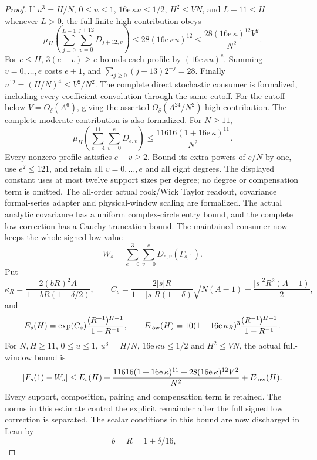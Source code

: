 \begin{proof}
If \(u^3=H/N\), \(0\leq u\leq1\),
\(16\mathrm e\,\kappa u\leq1/2\), \(H^2\leq VN\), and
\(L+11\leq H\) whenever \(L>0\), the full finite high contribution obeys
\begin{equation}\label{eq:finitehighbudget}
 \mu_H\!\left(\sum_{j=0}^{L-1}\sum_{v=0}^{j+12}D_{j+12,v}\right)
 \leq28(16\mathrm e\,\kappa u)^{12}
 \leq\frac{28(16\mathrm e\,\kappa)^{12}V^2}{N^2}.
\end{equation}
For \(e\leq H\), \(3(e-v)\geq e\) bounds each profile by
\((16\mathrm e\,\kappa u)^e\). Summing \(v=0,\ldots,e\) costs
\(e+1\), and \(\sum_{j\geq0}(j+13)2^{-j}=28\).
Finally \(u^{12}=(H/N)^4\leq V^2/N^2\).
The complete direct stochastic consumer is formalized, including
every coefficient convolution through the same cutoff.
For the cutoff below \(V=O_\delta(A^6)\), giving the asserted
\(O_\delta(A^{24}/N^2)\) high contribution.
The complete moderate contribution is also formalized. For \(N\geq11\),
\[
 \mu_H\!\left(\sum_{e=4}^{11}\sum_{v=0}^{e}D_{e,v}\right)
       \leq\frac{11616(1+16\mathrm e\,\kappa)^{11}}{N^2}.
\]
Every nonzero profile satisfies \(e-v\geq2\). Bound its extra powers
of \(e/N\) by one, use \(e^2\leq121\), and retain all \(v=0,\ldots,e\)
and all eight degrees. The displayed constant uses at most twelve
support sizes per degree; no degree or compensation term is omitted.
The all-order actual rook/Wick Taylor readout, covariance formal-series
adapter and physical-window scaling are formalized. The actual analytic
covariance has a uniform complex-circle entry bound, and the complete low
correction has a Cauchy truncation bound. The maintained consumer now keeps
the whole signed low value
\[
 W_s=\sum_{e=0}^{3}\sum_{v=0}^{e}D_{e,v}(\Gamma_{s,1}).
\]
Put
\[
 \kappa_R=\frac{2(bR)^2A}{1-bR(1-\delta/2)},\qquad
 C_s=\frac{2|s|R}{1-|s|R(1-\delta)}\sqrt{N(A-1)}
                 +\frac{|s|^2R^2(A-1)}2,
\]
and
\[
 E_s(H)=\exp(C_s)\frac{(R^{-1})^{H+1}}{1-R^{-1}},\qquad
 E_{\rm low}(H)=10(1+16\mathrm e\,\kappa_R)^3
                         \frac{(R^{-1})^{H+1}}{1-R^{-1}}.
\]
For \(N,H\geq11\), \(0\leq u\leq1\), \(u^3=H/N\),
\(16\mathrm e\,\kappa u\leq1/2\) and \(H^2\leq VN\), the actual
full-window bound is
\[
 |F_s(1)-W_s|
 \leq E_s(H)
 +\frac{11616(1+16\mathrm e\,\kappa)^{11}
             +28(16\mathrm e\,\kappa)^{12}V^2}{N^2}
 +E_{\rm low}(H).
\]
Every support, composition, pairing and compensation term is retained.
The norms in this estimate control the explicit remainder after the full
signed low correction is separated.
The scalar conditions in this bound are now discharged in Lean by
\[
 b=R=1+\delta/16,\qquad
\]
\end{proof}
